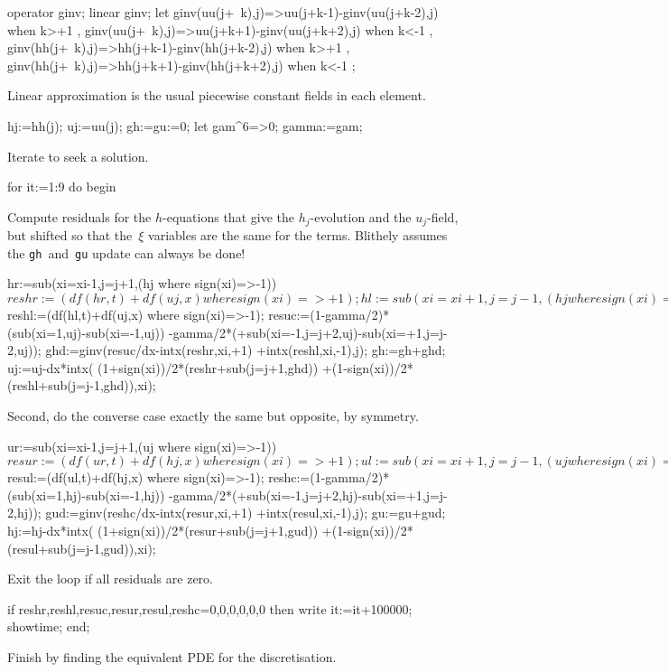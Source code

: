 \documentclass[10pt,a5paper]{article}
\begin{document}
\begin{reduce}
operator ginv; linear ginv;
let { ginv(uu(j+~k),j)=>uu(j+k-1)-ginv(uu(j+k-2),j) when k>+1
    , ginv(uu(j+~k),j)=>uu(j+k+1)-ginv(uu(j+k+2),j) when k<-1
    , ginv(hh(j+~k),j)=>hh(j+k-1)-ginv(hh(j+k-2),j) when k>+1
    , ginv(hh(j+~k),j)=>hh(j+k+1)-ginv(hh(j+k+2),j) when k<-1
    };
\end{reduce}
Linear approximation is the usual piecewise constant fields in each element.
\begin{reduce}
hj:=hh(j); uj:=uu(j);
gh:=gu:=0;
let gam^6=>0;
gamma:=gam;
\end{reduce}
Iterate to seek a solution.
\begin{reduce}
for it:=1:9 do begin
\end{reduce}
Compute residuals for the $h$-equations that give the $h_j$-evolution and the $u_j$-field, but shifted so that the~$\xi$
variables are the same for the terms.  Blithely assumes the \verb|gh|~and~\verb|gu| update can always be done!
\begin{reduce}
hr:=sub({xi=xi-1,j=j+1},(hj where sign(xi)=>-1))$
reshr:=(df(hr,t)+df(uj,x) where sign(xi)=>+1);
hl:=sub({xi=xi+1,j=j-1},(hj  where sign(xi)=>+1))$
reshl:=(df(hl,t)+df(uj,x) where sign(xi)=>-1);
resuc:=(1-gamma/2)*(sub(xi=1,uj)-sub(xi=-1,uj))
         -gamma/2*(+sub({xi=-1,j=j+2},uj)-sub({xi=+1,j=j-2},uj));
ghd:=ginv(resuc/dx-intx(reshr,xi,+1)
                  +intx(reshl,xi,-1),j);
gh:=gh+ghd;
uj:=uj-dx*intx( (1+sign(xi))/2*(reshr+sub(j=j+1,ghd))
               +(1-sign(xi))/2*(reshl+sub(j=j-1,ghd)),xi);
\end{reduce}
Second, do the converse case exactly the same but opposite, by symmetry.
\begin{reduce}
ur:=sub({xi=xi-1,j=j+1},(uj where sign(xi)=>-1))$
resur:=(df(ur,t)+df(hj,x) where sign(xi)=>+1);
ul:=sub({xi=xi+1,j=j-1},(uj where sign(xi)=>+1))$
resul:=(df(ul,t)+df(hj,x) where sign(xi)=>-1);
reshc:=(1-gamma/2)*(sub(xi=1,hj)-sub(xi=-1,hj))
         -gamma/2*(+sub({xi=-1,j=j+2},hj)-sub({xi=+1,j=j-2},hj));
gud:=ginv(reshc/dx-intx(resur,xi,+1)
                  +intx(resul,xi,-1),j);
gu:=gu+gud;
hj:=hj-dx*intx( (1+sign(xi))/2*(resur+sub(j=j+1,gud))
               +(1-sign(xi))/2*(resul+sub(j=j-1,gud)),xi);
\end{reduce}
Exit the loop if all residuals are zero.
\begin{reduce}
  if {reshr,reshl,resuc,resur,resul,reshc}={0,0,0,0,0,0}
  then write it:=it+100000;
  showtime;
end;
\end{reduce}
Finish by finding the equivalent PDE for the discretisation.
\end{document}
